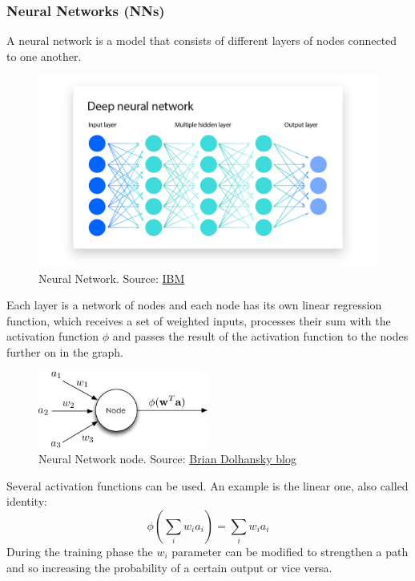 \documentclass[12pt]{article}
\begin{document}
    \subsubsection{Neural Networks (NNs)}
A neural network is a model that consists of different layers of nodes connected to one another.\begin{figure}[H]
\centering
        \includegraphics[width=1\textwidth]{DeepNeuralNetwork.png}
\caption[Neural Network]{Neural Network. Source: \href{https://www.ibm.com/topics/neural-networks}{IBM}}
\label{fig:nodeNN}
\end{figure}
Each layer is a network of nodes and each node has its own linear regression function, which receives a set of weighted inputs, processes their sum with the activation function $\phi$ and passes the result of the activation function to the nodes further on in the graph. 
    \begin{figure}[H]
    \centering
            \includegraphics[width=0.5\textwidth]{nodeNN.png}
    \caption[Neural Network node]{Neural Network node. Source: \href{https://www.briandolhansky.com/blog/artificial-neural-networks-linear-regression-part-1}{Brian Dolhansky blog}}
    \end{figure}
Several activation functions can be used. An example is the linear one, also called identity:
$$ \phi \left( \sum_i w_i a_i \right) =  \sum_i w_i a_i $$
During the training phase the $w_i$ parameter can be modified to strengthen a path and so increasing the probability of a certain output or vice versa.\\
\end{document}
